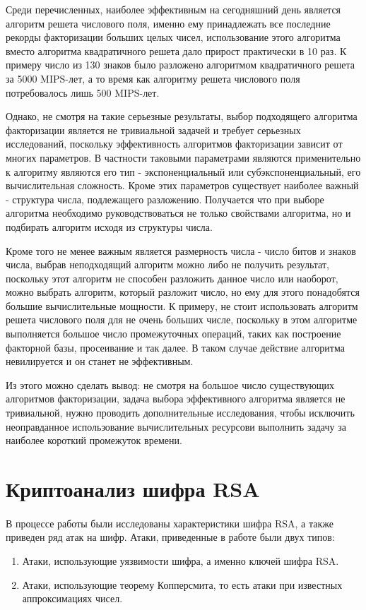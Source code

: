 	Среди перечисленных, наиболее эффективным на сегодняшний день является алгоритм решета числового поля, именно ему принадлежать все последние рекорды факторизации больших целых чисел, использование этого алгоритма вместо алгоритма квадратичного решета дало прирост практически в 10 раз.
	К примеру число из 130 знаков было разложено алгоритмом квадратичного решета за 5000 MIPS-лет, а то время как алгоритму решета числового поля потребовалось лишь 500 MIPS-лет.

	Однако, не смотря на такие серьезные результаты, выбор подходящего алгоритма факторизации является не тривиальной задачей и требует серьезных исследований, поскольку эффективность алгоритмов факторизации зависит от многих параметров. В частности таковыми параметрами являются применительно к алгоритму являются его тип - экспоненциальный или субэкспоненциальный, его вычислительная сложность. Кроме этих параметров существует наиболее важный - структура числа, подлежащего разложению. Получается что при выборе алгоритма необходимо руководствоваться не только свойствами алгоритма, но и подбирать алгоритм исходя из структуры числа. 

	Кроме того не менее важным является размерность числа - число битов и знаков числа, выбрав неподходящий алгоритм можно либо не получить результат, поскольку этот алгоритм не способен разложить данное число или наоборот, можно выбрать алгоритм, который разложит число, но ему для этого понадобятся большие вычислительные мощности. К примеру, не стоит использовать алгоритм решета числового поля для не очень больших числе, поскольку в этом алгоритме выполняется большое число промежуточных операций, таких как построение факторной базы, просеивание и так далее. В таком случае действие алгоритма невилируется и он станет не эффективным.

	Из этого можно сделать вывод: не смотря на большое число существующих алгоритмов факторизации, задача выбора эффективного алгоритма является не тривиальной, нужно проводить дополнительные исследования, чтобы исключить неоправданное использование вычислительных ресурсови выполнить задачу за наиболее короткий промежуток времени.

\section*{Криптоанализ шифра RSA}

	\paragraph{} В процессе работы были исследованы характеристики шифра RSA, а также приведен ряд атак на шифр. Атаки, приведенные в работе были двух типов:
		\begin{enumerate}
			\item Атаки, использующие уязвимости шифра, а именно ключей шифра RSA.
			\item Атаки, использующие теорему Копперсмита, то есть атаки при известных аппроксимациях чисел.
		\end{enumerate}

